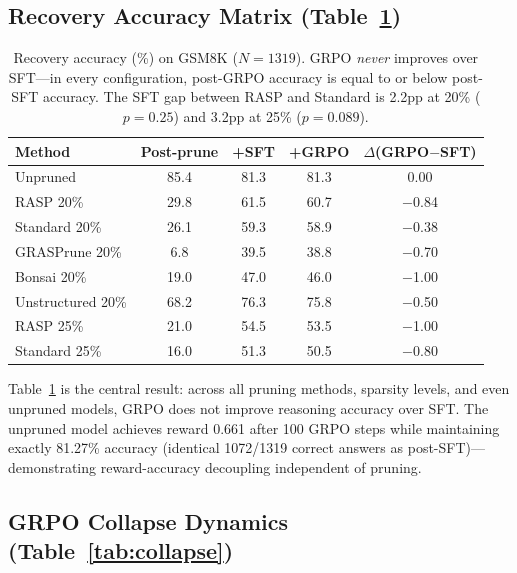 \documentclass[11pt,a4paper]{article}
\begin{document}
\subsection{Recovery Accuracy Matrix (Table~\ref{tab:recovery})}

\begin{table}[t]
\centering
\small
\begin{tabular}{lcccc}
\toprule
\textbf{Method} & \textbf{Post-prune} & \textbf{+SFT} & \textbf{+GRPO} & \textbf{$\Delta$(GRPO$-$SFT)} \\
\midrule
Unpruned & 85.4 & 81.3 & 81.3 & 0.00 \\
\midrule
RASP 20\% & 29.8 & 61.5 & 60.7 & $-$0.84 \\
Standard 20\% & 26.1 & 59.3 & 58.9 & $-$0.38 \\
GRASPrune 20\% & 6.8 & 39.5 & 38.8 & $-$0.70 \\
Bonsai 20\% & 19.0 & 47.0 & 46.0 & $-$1.00 \\
Unstructured 20\% & 68.2 & 76.3 & 75.8 & $-$0.50 \\
\midrule
RASP 25\% & 21.0 & 54.5 & 53.5 & $-$1.00 \\
Standard 25\% & 16.0 & 51.3 & 50.5 & $-$0.80 \\
\bottomrule
\end{tabular}
\caption{Recovery accuracy (\%) on GSM8K ($N=1319$). GRPO \emph{never} improves over SFT---in every configuration, post-GRPO accuracy is equal to or below post-SFT accuracy. The SFT gap between RASP and Standard is 2.2pp at 20\% ($p=0.25$) and 3.2pp at 25\% ($p=0.089$).}
\label{tab:recovery}
\end{table}

Table~\ref{tab:recovery} is the central result: across all pruning methods, sparsity levels, and even unpruned models, GRPO does not improve reasoning accuracy over SFT. The unpruned model achieves reward 0.661 after 100 GRPO steps while maintaining exactly 81.27\% accuracy (identical 1072/1319 correct answers as post-SFT)---demonstrating reward-accuracy decoupling independent of pruning.

\subsection{GRPO Collapse Dynamics (Table~\ref{tab:collapse})}
\end{document}

